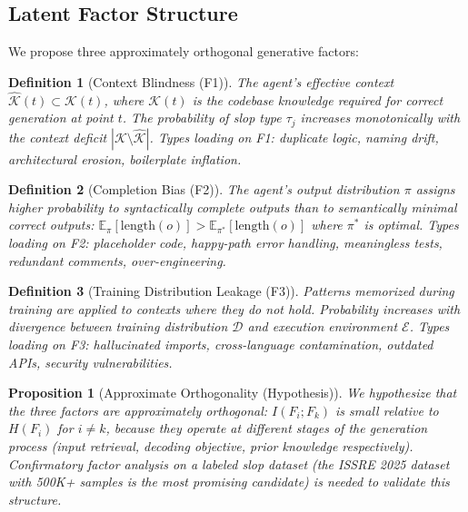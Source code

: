 \documentclass[11pt, a4paper, copyright]{googledeepmind}
\newtheorem{definition}{Definition}[section]
\newtheorem{proposition}{Proposition}[section]
\begin{document}
\subsection{Latent Factor Structure}

We propose three approximately orthogonal generative factors:

\begin{definition}[Context Blindness (F1)]
The agent's effective context $\hat{\mathcal{K}}(t) \subset \mathcal{K}(t)$, where $\mathcal{K}(t)$ is the codebase knowledge required for correct generation at point $t$. The probability of slop type $\tau_j$ increases monotonically with the context deficit $|\mathcal{K} \setminus \hat{\mathcal{K}}|$. Types loading on F1: duplicate logic, naming drift, architectural erosion, boilerplate inflation.
\end{definition}

\begin{definition}[Completion Bias (F2)]
The agent's output distribution $\pi$ assigns higher probability to syntactically complete outputs than to semantically minimal correct outputs: $\mathbb{E}_\pi[\mathrm{length}(o)] > \mathbb{E}_{\pi^*}[\mathrm{length}(o)]$ where $\pi^*$ is optimal. Types loading on F2: placeholder code, happy-path error handling, meaningless tests, redundant comments, over-engineering.
\end{definition}

\begin{definition}[Training Distribution Leakage (F3)]
Patterns memorized during training are applied to contexts where they do not hold. Probability increases with divergence between training distribution $\mathcal{D}$ and execution environment $\mathcal{E}$. Types loading on F3: hallucinated imports, cross-language contamination, outdated APIs, security vulnerabilities.
\end{definition}

\begin{proposition}[Approximate Orthogonality (Hypothesis)]
\label{prop:orthogonal}
We \emph{hypothesize} that the three factors are approximately orthogonal: $I(F_i; F_k)$ is small relative to $H(F_i)$ for $i \neq k$, because they operate at different stages of the generation process (input retrieval, decoding objective, prior knowledge respectively). Confirmatory factor analysis on a labeled slop dataset (the ISSRE 2025 dataset with 500K+ samples is the most promising candidate) is needed to validate this structure.
\end{proposition}
\end{document}
